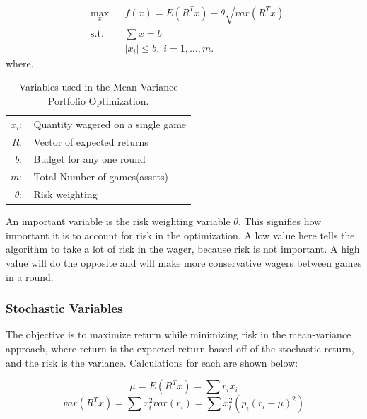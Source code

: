 \documentclass[12pt]{article}
\begin{document}
\begin{equation}
\begin{aligned}
& \underset{x}{\text{max}}
& & f(x) =  E(R^Tx)-\theta\sqrt{var(R^Tx)}\\
& \text{s.t.}
& & \sum{x}=b\\
&&& |x_i| \leq b, \; i = 1, \ldots, m.
\end{aligned}
\label{portOpt}
\end{equation}
where,

\begin{table}[htbp!]
\begin{centering}
    \begin{tabular}{r l}
    $x_i:$      & Quantity wagered on a single game \\ 
    $R:$        & Vector of expected returns        \\ 
    $b:$        & Budget for any one round       	\\ 
    $m:$        & Total Number of games(assets)    	\\ 
    $\theta:$	& Risk weighting					\\
    \end{tabular}
    \label{mop_vars}
    \caption{Variables used in the Mean-Variance Portfolio Optimization.}
\end{centering}
\end{table}
An important variable is the risk weighting variable $\theta$.
This signifies how important it is to account for risk in the optimization.
A low value here tells the algorithm to take a lot of risk in the wager, because risk is not important.
A high value will do the opposite and will make more conservative wagers between games in a round.

\subsubsection*{Stochastic Variables}
The objective is to maximize return while minimizing risk in the mean-variance approach, where return is the expected return based off of the stochastic return, and the risk is the variance.
Calculations for each are shown below:

\begin{equation}
\mu = E(R^Tx)=\sum r_i x_i
\end{equation}
\begin{equation}
var(R^Tx)=\sum x_i^2var(r_i)=\sum x_i^2(p_i(r_i-\mu)^2)
\end{equation}
\end{document}
